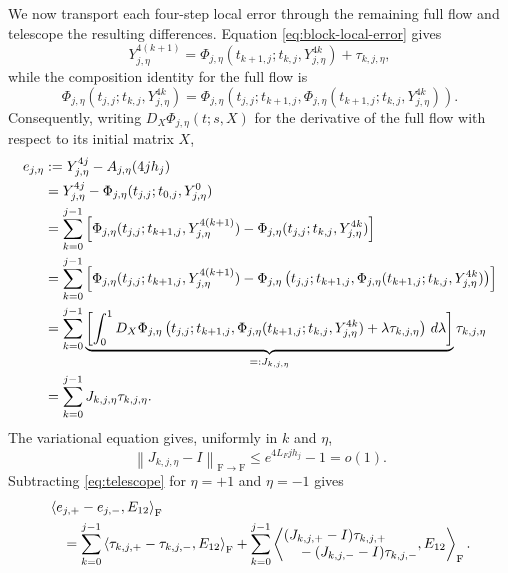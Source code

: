 \documentclass[]{article}
\numberwithin{equation}{section}
\theoremstyle{plain}
\theoremstyle{remark}
\newcommand{\F}{\mathrm F}
\newcommand{\norm}[1]{\left\lVert #1\right\rVert}
\newcommand{\ip}[2]{\left\langle #1,#2\right\rangle_{\F}}
\begin{document}
We now transport each four-step local error through the remaining full
flow and telescope the resulting differences.  Equation
\eqref{eq:block-local-error} gives
\[
 Y_{j,\eta}^{4(k+1)}
 =\Phi_{j,\eta}(t_{k+1,j};t_{k,j},Y_{j,\eta}^{4k})
 +\tau_{k,j,\eta},
\]
while the composition identity for the full flow is
\[
 \Phi_{j,\eta}(t_{j,j};t_{k,j},Y_{j,\eta}^{4k})
 =\Phi_{j,\eta}\left(
 t_{j,j};t_{k+1,j},
 \Phi_{j,\eta}(t_{k+1,j};t_{k,j},Y_{j,\eta}^{4k})\right).
\]
Consequently, writing $D_X\Phi_{j,\eta}(t;s,X)$ for the derivative of
the full flow with respect to its initial matrix $X$,
\begin{align}
 e_{j,\eta}
 &:=Y_{j,\eta}^{4j}-A_{j,\eta}(4jh_j)\notag\\
 &=Y_{j,\eta}^{4j}
   -\Phi_{j,\eta}(t_{j,j};t_{0,j},Y_{j,\eta}^{0})\notag\\
 &=\sum_{k=0}^{j-1}\left[
 \Phi_{j,\eta}(t_{j,j};t_{k+1,j},Y_{j,\eta}^{4(k+1)})
 -\Phi_{j,\eta}(t_{j,j};t_{k,j},Y_{j,\eta}^{4k})\right]\notag\\
 &=\sum_{k=0}^{j-1}\left[
 \Phi_{j,\eta}(t_{j,j};t_{k+1,j},Y_{j,\eta}^{4(k+1)})
 -\Phi_{j,\eta}\left(
 t_{j,j};t_{k+1,j},
 \Phi_{j,\eta}(t_{k+1,j};t_{k,j},Y_{j,\eta}^{4k})\right)\right]
 \notag\\
 &=\sum_{k=0}^{j-1}\underbrace{\left[\int_0^1
 D_X\Phi_{j,\eta}
 \left(t_{j,j};t_{k+1,j},
 \Phi_{j,\eta}(t_{k+1,j};t_{k,j},Y_{j,\eta}^{4k})
 +\lambda\tau_{k,j,\eta}\right)\,d\lambda\right]}_{=:J_{k,j,\eta}}
 \tau_{k,j,\eta}\notag\\
 &=\sum_{k=0}^{j-1}J_{k,j,\eta}\tau_{k,j,\eta}.
 \label{eq:telescope}
\end{align}
The variational equation gives, uniformly in $k$ and $\eta$,
\begin{equation}\label{eq:transport-close}
 \norm{J_{k,j,\eta}-I}_{\F\to\F}
 \le e^{4L_Fjh_j}-1=o(1).
\end{equation}
Subtracting \eqref{eq:telescope} for $\eta=+1$ and $\eta=-1$ gives
\begin{align}
 &\ip{e_{j,+}-e_{j,-}}{E_{12}}\notag\\
 &\quad=\sum_{k=0}^{j-1}
 \ip{\tau_{k,j,+}-\tau_{k,j,-}}{E_{12}}
 +\sum_{k=0}^{j-1}
 \left\langle
 \begin{aligned}
 &(J_{k,j,+}-I)\tau_{k,j,+}\\[-1mm]
 &\quad -(J_{k,j,-}-I)\tau_{k,j,-}
 \end{aligned},E_{12}\right\rangle_{\F}.
 \label{eq:accumulation-decomposition}
\end{align}
\end{document}

